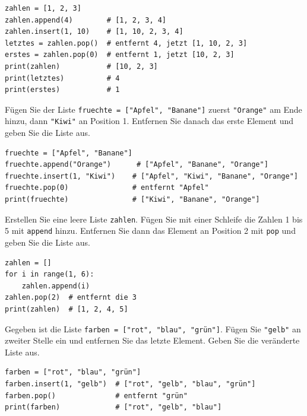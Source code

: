 \begin{myexample}
\begin{lstlisting}
zahlen = [1, 2, 3]
zahlen.append(4)        # [1, 2, 3, 4]
zahlen.insert(1, 10)    # [1, 10, 2, 3, 4]
letztes = zahlen.pop()  # entfernt 4, jetzt [1, 10, 2, 3]
erstes = zahlen.pop(0)  # entfernt 1, jetzt [10, 2, 3]
print(zahlen)           # [10, 2, 3]
print(letztes)          # 4
print(erstes)           # 1
\end{lstlisting}
\end{myexample}

\begin{myexercise}
    Fügen Sie der Liste \lstinline|fruechte = ["Apfel", "Banane"]| zuerst \lstinline|"Orange"| am Ende hinzu, dann \lstinline|"Kiwi"| an Position 1. Entfernen Sie danach das erste Element und geben Sie die Liste aus.

    \begin{myanswer}
        \begin{lstlisting}
fruechte = ["Apfel", "Banane"]
fruechte.append("Orange")      # ["Apfel", "Banane", "Orange"]
fruechte.insert(1, "Kiwi")    # ["Apfel", "Kiwi", "Banane", "Orange"]
fruechte.pop(0)               # entfernt "Apfel"
print(fruechte)               # ["Kiwi", "Banane", "Orange"]
\end{lstlisting}
    \end{myanswer}
\end{myexercise}

\begin{myexercise}
    Erstellen Sie eine leere Liste \lstinline|zahlen|. Fügen Sie mit einer Schleife die Zahlen 1 bis 5 mit \lstinline|append| hinzu. Entfernen Sie dann das Element an Position 2 mit \lstinline|pop| und geben Sie die Liste aus.

    \begin{myanswer}
        \begin{lstlisting}
zahlen = []
for i in range(1, 6):
    zahlen.append(i)
zahlen.pop(2)  # entfernt die 3
print(zahlen)  # [1, 2, 4, 5]
\end{lstlisting}
    \end{myanswer}
\end{myexercise}

\begin{myexercise}
    Gegeben ist die Liste \lstinline|farben = ["rot", "blau", "grün"]|. Fügen Sie \lstinline|"gelb"| an zweiter Stelle ein und entfernen Sie das letzte Element. Geben Sie die veränderte Liste aus.

    \begin{myanswer}
        \begin{lstlisting}
farben = ["rot", "blau", "grün"]
farben.insert(1, "gelb")  # ["rot", "gelb", "blau", "grün"]
farben.pop()              # entfernt "grün"
print(farben)             # ["rot", "gelb", "blau"]
\end{lstlisting}
    \end{myanswer}
\end{myexercise}

